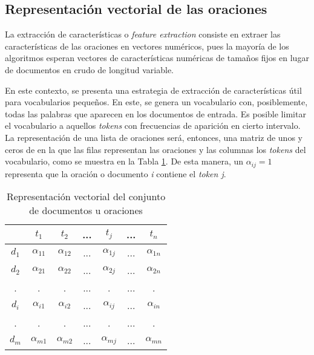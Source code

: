 \documentclass[conference]{IEEEtran}
\begin{document}
    
    \subsection{Representación vectorial de las oraciones}
    
        La extracción de características o \textit{feature extraction} consiste en extraer las características de las oraciones en vectores numéricos, pues la mayoría de los algoritmos esperan vectores de características numéricas de tamaños fijos en lugar de documentos en crudo de longitud variable.
        
        En este contexto, se presenta una estrategia de extracción de características útil para vocabularios pequeños. En este, se genera un vocabulario con, posiblemente, todas las palabras que aparecen en los documentos de entrada. Es posible limitar el vocabulario a aquellos \textit{tokens} con frecuencias de aparición en cierto intervalo. La representación de una lista de oraciones será, entonces, una matriz de unos y ceros de en la que las filas representan las oraciones y las columnas los \textit{tokens} del vocabulario, como se muestra en la Tabla \ref{tab:vectores1}. De esta manera, un $\alpha_{ij} = 1$ representa que la oración o documento \textit{i} contiene el \textit{token j}.
        
        \begin{table}[]
            \centering
            \caption{Representación vectorial del conjunto de documentos u oraciones}
            \label{tab:vectores1}
            \begin{tabular}{c|cccccc}
                       & $t_1$         & $t_2$         & ... & $t_j$         & ... & $t_n$\\ \hline
                $d_1$  & $\alpha_{11}$ & $\alpha_{12}$ & ... & $\alpha_{1j}$ & ... & $\alpha_{1n}$\\
                $d_2$  & $\alpha_{21}$ & $\alpha_{22}$ & ... & $\alpha_{2j}$ & ... & $\alpha_{2n}$\\
                .  & .             & .             & ... & .             & ... & . \\
                $d_i$  & $\alpha_{i1}$ & $\alpha_{i2}$ & ... & $\alpha_{ij}$ & ... & $\alpha_{in}$ \\
                .  & .             & .             & ... & .             & ... & . \\
                $d_m$  & $\alpha_{m1}$ & $\alpha_{m2}$ & ... & $\alpha_{mj}$ & ... & $\alpha_{mn}$
            \end{tabular}
        \end{table}
    
\end{document}
